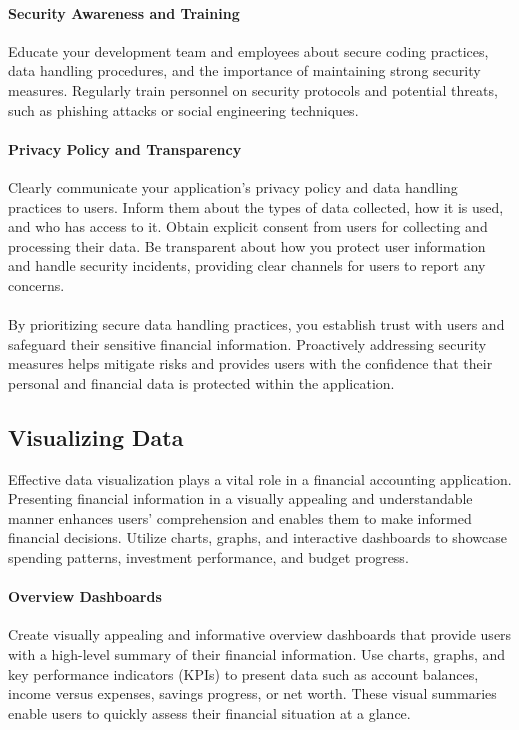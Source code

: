 \paragraph{Security Awareness and Training}
Educate your development team and employees about secure coding practices, data 
handling procedures, and the importance of maintaining strong security measures. Regularly train personnel on 
security protocols and potential threats, such as phishing attacks or social engineering techniques.

\paragraph{Privacy Policy and Transparency}
Clearly communicate your application's privacy policy and data handling practices to 
users. Inform them about the types of data collected, how it is used, and who has access to it. Obtain explicit 
consent from users for collecting and processing their data. Be transparent about how you protect user information 
and handle security incidents, providing clear channels for users to report any concerns.\\
\\

By prioritizing secure data handling practices, you establish trust with users and safeguard their sensitive 
financial information. Proactively addressing security measures helps mitigate risks and provides users with 
the confidence that their personal and financial data is protected within the application.


\subsection{Visualizing Data}

Effective data visualization plays a vital role in a financial accounting application. Presenting financial 
information in a visually appealing and understandable manner enhances users' comprehension and enables them 
to make informed financial decisions. Utilize charts, graphs, and interactive dashboards to showcase spending 
patterns, investment performance, and budget progress.

\paragraph{Overview Dashboards}
Create visually appealing and informative overview dashboards that provide users with a high-level summary of their 
financial information. Use charts, graphs, and key performance indicators (KPIs) to present data such as account 
balances, income versus expenses, savings progress, or net worth. These visual summaries enable users to quickly 
assess their financial situation at a glance.

